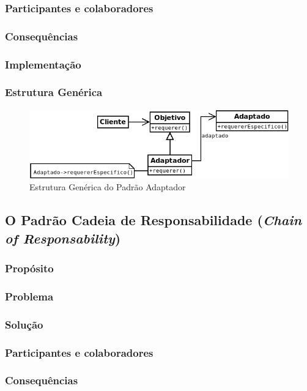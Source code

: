 \subsubsection{Participantes e colaboradores}
\subsubsection{Consequências}
\subsubsection{Implementação}
\subsubsection{Estrutura Genérica}

\begin{figure}[h]
\begin{center}
\includegraphics[scale=0.6]{adaptador.png}
\caption{Estrutura Genérica do Padrão Adaptador}\label{fig:adaptador}
\end{center}
\end{figure}

\subsection{O Padrão Cadeia de Responsabilidade (\textit{Chain of Responsability})}
\subsubsection{Propósito}
\subsubsection{Problema}
\subsubsection{Solução}
\subsubsection{Participantes e colaboradores}
\subsubsection{Consequências}
